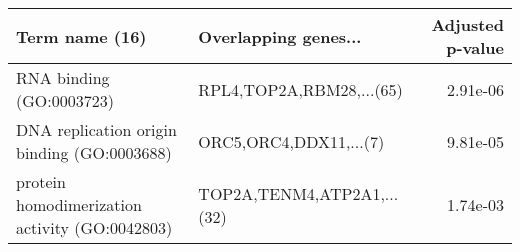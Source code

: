\begin{tabular}{llr}
\toprule
                                Term name (16) &       Overlapping genes... &  Adjusted p-value \\
\midrule
                      RNA binding (GO:0003723) &   RPL4,TOP2A,RBM28,...(65) &          2.91e-06 \\
   DNA replication origin binding (GO:0003688) &     ORC5,ORC4,DDX11,...(7) &          9.81e-05 \\
protein homodimerization activity (GO:0042803) & TOP2A,TENM4,ATP2A1,...(32) &          1.74e-03 \\
\bottomrule
\end{tabular}
